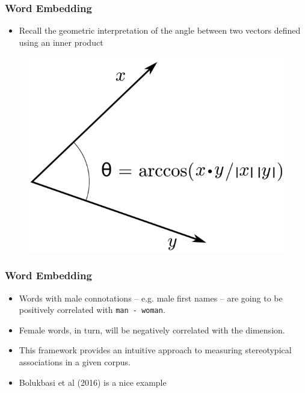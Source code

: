 \documentclass[
  shownotes,
  xcolor={svgnames},
  hyperref={colorlinks,citecolor=DarkBlue,linkcolor=DarkRed,urlcolor=DarkBlue}
  , aspectratio=169]{beamer}
\begin{document}
\begin{frame}
\frametitle{Word Embedding }

\begin{itemize}
\item Recall the geometric interpretation of the angle between two vectors defined using an inner product
\end{itemize}

  \begin{figure}[H] \centering
            \captionsetup{justification=centering}
              \includegraphics[scale=0.4]{figures/Inner_product_angle.png}
              
 \end{figure}


\end{frame}
\begin{frame}
\frametitle{Word Embedding }
\begin{itemize}



\item Words with male connotations – e.g. male first names – are going to be positively correlated with \texttt{man - woman}.
\medskip
\item Female words, in turn, will be negatively correlated with the dimension.
\medskip
\item This framework provides an intuitive approach to measuring stereotypical associations in a given corpus. 
\medskip
\item Bolukbasi et al (2016) is a nice example
\end{itemize}

 \end{frame}
\end{document}
